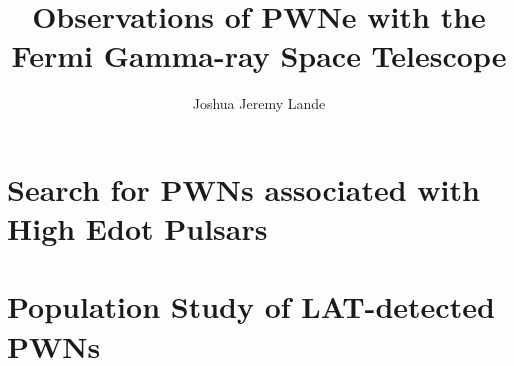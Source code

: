 \documentclass[12pt]{report}
\title{Observations of PWNe with the Fermi Gamma-ray Space Telescope}
\author{Joshua Jeremy Lande}
\begin{document}
\listoftodos
\newpage
 


\beforepreface


\afterpreface




\acresetall















\chapter{Search for \acsp{PWN} associated with High Edot Pulsars}

\chapter{Population Study of LAT-detected \acsp{PWN}}


\appendix

%
%
%





\end{document}

